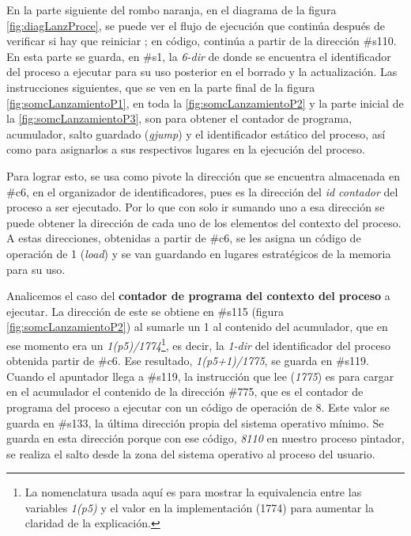 \documentclass[letterpaper,12pt,oneside]{book}
\begin{document}
  
		En la parte siguiente del rombo naranja, en el diagrama  de la figura \ref{fig:diagLanzProce},
		se puede ver el flujo de ejecución que continúa después de verificar si hay que reiniciar
		; en código, continúa a partir de la dirección \#s110. En esta parte se guarda, en \#s1,
		la \textit{6-dir} de donde se encuentra el identificador del proceso a ejecutar para su uso posterior en
		el borrado y la actualización. Las instrucciones siguientes, que se ven en la parte final de la figura  \ref{fig:somcLanzamientoP1},
		en toda la \ref{fig:somcLanzamientoP2} y la parte inicial de la \ref{fig:somcLanzamientoP3}, son para obtener el contador de programa, 
		acumulador, 
		salto 
		guardado (\textit{gjump}) y
		el  identificador estático del proceso, así como para asignarlos  a sus respectivos lugares en la ejecución del proceso.
  
        Para lograr esto, se usa como pivote la dirección
		que se encuentra almacenada en \#c6, en el organizador de identificadores, pues es la dirección del \textit{id contador}
		del proceso a ser ejecutado. Por lo que con solo ir sumando uno a esa dirección se puede obtener la dirección de 
		cada uno de los elementos
		del contexto del proceso. A estas direcciones, obtenidas a partir de \#c6,
		se les asigna un código de operación de 1 (\textit{load}) y se van guardando en lugares estratégicos de
		la memoria para su uso.
        
        Analicemos el caso del \textbf{contador de programa del contexto del proceso} a ejecutar.
        La dirección de este se obtiene en \#s115 (figura \ref{fig:somcLanzamientoP2})
        al sumarle un 1 al contenido del acumulador, que en ese 
        momento era un \textit{1(p5)/1774}\footnote{La nomenclatura usada aquí es para mostrar la equivalencia entre las variables \textit{1(p5)}
        y el valor en la implementación (1774) para aumentar la claridad de la explicación.},
        es decir, la \textit{1-dir} del identificador del proceso obtenida partir de \#c6.
         Ese resultado, \textit{1(p5+1)/1775},  
        se guarda en \#s119. Cuando el apuntador llega a \#s119, la instrucción que lee (\textit{1775})  es para 
        cargar en el acumulador el contenido de la dirección \#775, que es
		el contador de programa del proceso a ejecutar con un código de operación de 8.
		Este valor se guarda en \#s133, la última dirección
		propia del sistema operativo mínimo. Se guarda en esta dirección porque con ese código, \textit{8110} en nuestro
		proceso pintador, se realiza el salto 
		desde la zona del sistema operativo 
		al proceso del usuario.
		
\end{document}
